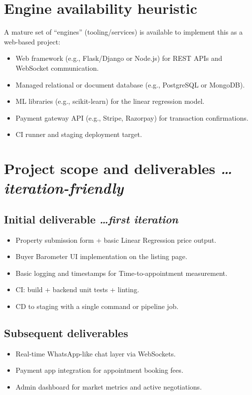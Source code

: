 \documentclass[11pt,a4paper]{article}
\newcommand{\BvrHint}[1]{%
  {\normalfont\normalsize\itshape\hfill #1}}
\begin{document}
\section{Engine availability heuristic}
A mature set of ``engines'' (tooling/services) is available to implement this as a web-based project:
\begin{itemize}[leftmargin=0.7cm]
    \item Web framework (e.g., Flask/Django or Node.js) for REST APIs and WebSocket communication.
    \item Managed relational or document database (e.g., PostgreSQL or MongoDB).
    \item ML libraries (e.g., scikit-learn) for the linear regression model.
    \item Payment gateway API (e.g., Stripe, Razorpay) for transaction confirmations.
    \item CI runner and staging deployment target.
\end{itemize}

\section{Project scope and deliverables %
\BvrHint{\ldots iteration-friendly}}
\subsection{Initial deliverable %
\BvrHint{\ldots first iteration}}
\begin{itemize}[leftmargin=0.7cm]
    \item Property submission form + basic Linear Regression price output.
    \item Buyer Barometer UI implementation on the listing page.
    \item Basic logging and timestamps for Time-to-appointment measurement.
    \item CI: build + backend unit tests + linting.
    \item CD to staging with a single command or pipeline job.
\end{itemize}

\subsection{Subsequent deliverables}
\begin{itemize}[leftmargin=0.7cm]
    \item Real-time WhatsApp-like chat layer via WebSockets.
    \item Payment app integration for appointment booking fees.
    \item Admin dashboard for market metrics and active negotiations.
\end{itemize}
\end{document}
